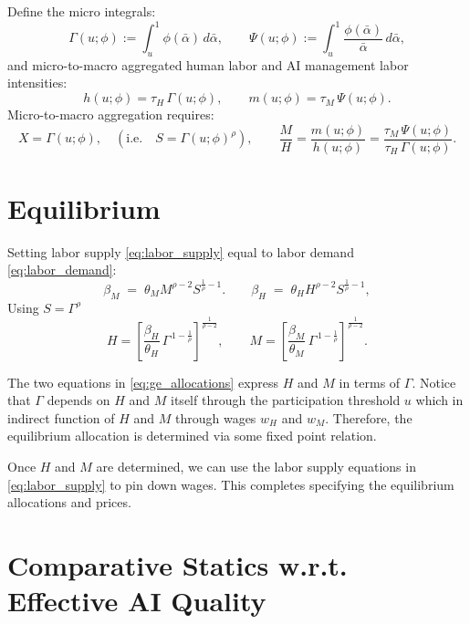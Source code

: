 \documentclass[english]{article}
\begin{document}
Define the micro integrals:
\begin{equation}
\Gamma(u;\phi):=\int_{u}^{1}\phi(\bar{\alpha})\,d\bar{\alpha},
\qquad
\Psi(u;\phi):=\int_{u}^{1}\frac{\phi(\bar{\alpha})}{\bar{\alpha}}\,d\bar{\alpha}, \label{eq:micro_integrals}
\end{equation}
and micro-to-macro aggregated human labor and AI management labor intensities:
\[
h(u;\phi)=\tau_H\,\Gamma(u;\phi),
\qquad 
m(u;\phi)=\tau_M\,\Psi(u;\phi).
\]
Micro-to-macro aggregation requires:
\begin{equation}
X=\Gamma(u;\phi),\quad (\text{i.e.}\quad S=\Gamma(u;\phi)^{\rho}),
\qquad 
\frac{M}{H}=\frac{m(u;\phi)}{h(u;\phi)}=\frac{\tau_M\,\Psi(u;\phi)}{\tau_H\,\Gamma(u;\phi)}.
\label{eq:AggMix}
\end{equation}

\section*{Equilibrium}
Setting labor supply \eqref{eq:labor_supply} equal to labor demand \eqref{eq:labor_demand}:
\begin{equation}
\beta_M \;=\; \theta_M M^{\rho-2} S^{\frac{1}{\rho}-1}.
\qquad
\beta_H \;=\; \theta_H H^{\rho-2} S^{\frac{1}{\rho}-1}, \label{eq:labor_demand_supply}
\end{equation}
Using $S=\Gamma^\rho$
\begin{equation}
H
= \left[ \frac{\beta_H}{\theta_H}\,\Gamma^{\,1-\frac{1}{\rho}} \right]^{\frac{1}{\rho-2}},
\qquad
M
= \left[ \frac{\beta_M}{\theta_M}\,\Gamma^{\,1-\frac{1}{\rho}} \right]^{\frac{1}{\rho-2}}. \label{eq:ge_allocations}
\end{equation}

The two equations in \eqref{eq:ge_allocations} express $H$ and $M$ in terms of $\Gamma$. 
Notice that $\Gamma$ depends on $H$ and $M$ itself through the participation threshold $u$ which in indirect function of $H$ and $M$ through wages $w_H$ and $w_M$.
Therefore, the equilibrium allocation is determined via some fixed point relation.

Once $H$ and $M$ are determined, we can use the labor supply equations in \eqref{eq:labor_supply} to pin down wages.
This completes specifying the equilibrium allocations and prices.


\section*{Comparative Statics w.r.t. Effective AI Quality}
\end{document}
